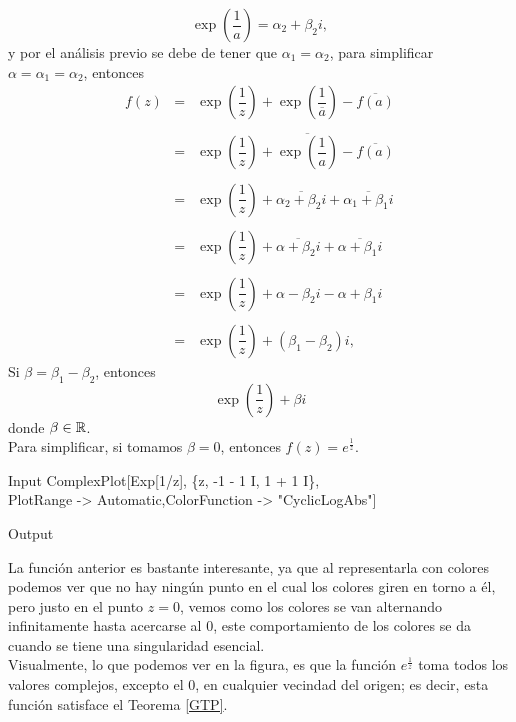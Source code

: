 \begin{Ejem}
	$$\exp\left(\dfrac{1}{a}\right)=\alpha_2+\beta_2 i,$$
	y por el análisis previo se debe de tener que $\alpha_1=\alpha_2$, para simplificar $\alpha=\alpha_1=\alpha_2$, entonces 
	\[
	\begin{array}{ccl}
		f(z)&=&\exp\left({\dfrac{1}{z}}\right)+\exp\left({\dfrac{1}{\overline{a}}}\right)-\overline{f(a)}\\\\
		&=&\exp\left({\dfrac{1}{z}}\right)+\overline{\exp\left({\dfrac{1}{a}}\right)}-\overline{f(a)}\\\\
		&=&\exp\left(\dfrac{1}{z}\right)+\overline{\alpha_2+\beta_2 i}+\overline{\alpha_1+\beta_1 i}\\\\
		&=&\exp\left(\dfrac{1}{z}\right)+\overline{\alpha+\beta_2 i}+\overline{\alpha+\beta_1 i}\\\\
		&=&\exp\left(\dfrac{1}{z}\right)+\alpha-\beta_2 i-\alpha+\beta_1 i\\\\
		&=&\exp\left(\dfrac{1}{z}\right)+(\beta_1-\beta_2)i,
	\end{array}
	\]
	Si $\beta=\beta_1-\beta_2$, entonces $$\exp\left({\dfrac{1}{z}}\right)+\beta i$$
	donde  $\beta\in \mathbb{R}$.\\
	Para simplificar, si tomamos $\beta=0$,  entonces $f(z)=e^{\frac{1}{z}}$.\begin{mmaCell}{Input}
		ComplexPlot[Exp[1/z], \{z, -1 - 1 I, 1 + 1 I\},\\PlotRange -> Automatic,ColorFunction -> "CyclicLogAbs"]
	\end{mmaCell}
	
	\begin{mmaCell}[moregraphics={moreig={scale=.25}}]{Output}
	\end{mmaCell}
La función anterior es bastante interesante, ya que al representarla con colores podemos ver que no hay ningún punto en el cual los colores giren en torno a él, pero justo en el punto $z=0$, vemos como los colores se van alternando infinitamente hasta acercarse  al $0$, este comportamiento de los colores se da cuando se tiene una singularidad esencial.\\
Visualmente, lo que podemos ver en la figura, es que la función $e^{\frac{1}{z}}$ toma todos los valores complejos, excepto el $0$, en cualquier vecindad del origen; es decir, esta función satisface el Teorema \ref{GTP}.\endproof
\end{Ejem}


